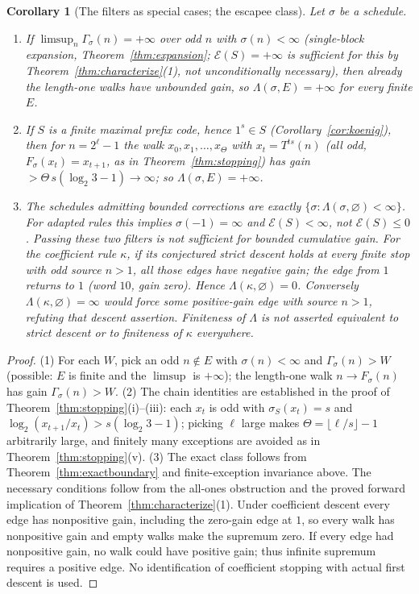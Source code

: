 \documentclass[11pt]{amsart}
\newtheorem{corollary}[theorem]{Corollary}
\theoremstyle{definition}
\theoremstyle{remark}
\begin{document}
\begin{corollary}[The filters as special cases; the escapee class]\label{cor:exactboundary}
Let $\sigma$ be a schedule.
\begin{enumerate}
\item If $\limsup_{n}\Gamma_\sigma(n) = +\infty$ over odd $n$ with $\sigma(n) < \infty$ (single-block expansion, Theorem~\ref{thm:expansion}; $\mathcal E(S)=+\infty$ is sufficient for this by Theorem~\ref{thm:characterize}(1), not unconditionally necessary), then already the length-one walks have unbounded gain, so $\Lambda(\sigma,E) = +\infty$ for every finite $E$.
\item If $S$ is a finite maximal prefix code, hence $1^s \in S$ (Corollary~\ref{cor:koenig}), then for $n = 2^\ell - 1$ the walk $x_0, x_1, \dots, x_\Theta$ with $x_t = T^{ts}(n)$ (all odd, $F_\sigma(x_t) = x_{t+1}$, as in Theorem~\ref{thm:stopping}) has gain $> \Theta\, s(\log_2 3 - 1) \to \infty$; so $\Lambda(\sigma,E) = +\infty$.
\item The schedules admitting bounded corrections are exactly $\{\sigma:\Lambda(\sigma,\varnothing)<\infty\}$. For adapted rules this implies $\sigma(-1)=\infty$ and $\mathcal E(S)<\infty$, not $\mathcal E(S)\le0$. Passing these two filters is not sufficient for bounded cumulative gain. For the coefficient rule $\kappa$, if its conjectured strict descent holds at every finite stop with odd source $n>1$, all those edges have negative gain; the edge from $1$ returns to $1$ (word $10$, gain zero). Hence $\Lambda(\kappa,\varnothing)=0$. Conversely $\Lambda(\kappa,\varnothing)=\infty$ would force some positive-gain edge with source $n>1$, refuting that descent assertion. Finiteness of $\Lambda$ is not asserted equivalent to strict descent or to finiteness of $\kappa$ everywhere.
\end{enumerate}
\end{corollary}

\begin{proof}
(1) For each $W$, pick an odd $n \notin E$ with $\sigma(n) < \infty$ and $\Gamma_\sigma(n) > W$ (possible: $E$ is finite and the $\limsup$ is $+\infty$); the length-one walk $n \to F_\sigma(n)$ has gain $\Gamma_\sigma(n) > W$. (2) The chain identities are established in the proof of Theorem~\ref{thm:stopping}(i)--(iii): each $x_t$ is odd with $\sigma_S(x_t) = s$ and $\log_2(x_{t+1}/x_t) > s(\log_2 3 - 1)$; picking $\ell$ large makes $\Theta = \lfloor \ell/s\rfloor - 1$ arbitrarily large, and finitely many exceptions are avoided as in Theorem~\ref{thm:stopping}(v). (3) The exact class follows from Theorem~\ref{thm:exactboundary} and finite-exception invariance above. The necessary conditions follow from the all-ones obstruction and the proved forward implication of Theorem~\ref{thm:characterize}(1). Under coefficient descent every edge has nonpositive gain, including the zero-gain edge at $1$, so every walk has nonpositive gain and empty walks make the supremum zero. If every edge had nonpositive gain, no walk could have positive gain; thus infinite supremum requires a positive edge. No identification of coefficient stopping with actual first descent is used.
\end{proof}
\end{document}
